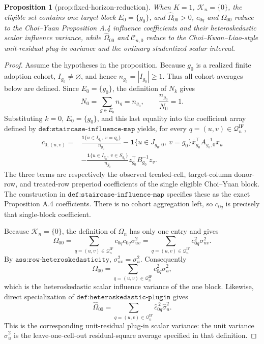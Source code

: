 \documentclass{article}
\newtheorem{proposition}{Proposition}
\begin{document}
\begin{proposition}[prop:fixed-horizon-reduction]\label{prop:fixed-horizon-reduction}
When \(K=1\), \(\mathcal K_n=\{0\}\), the eligible set contains one target block \(E_0=\{g_0\}\), and \(\widehat\Omega_{00}>0\), \(c_{0q}\) and \(\Omega_{00}\) reduce to the Choi--Yuan Proposition A.4 influence coefficients and their heteroskedastic scalar influence variance, while \(\widehat\Omega_{00}\) and \(\mathcal C_{n,0}\) reduce to the Choi--Kwon--Liao-style unit-residual plug-in variance and the ordinary studentized scalar interval.
\end{proposition}
\begin{proof}
Assume the hypotheses in the proposition.  Because \(g_0\) is a realized
finite adoption cohort, \(I_{g_0}\neq\varnothing\), and hence
\(n_{g_0}=|I_{g_0}|\geq 1\).  Thus all cohort averages below are defined.
Since \(E_0=\{g_0\}\), the definition of \(N_k\) gives
\[
N_0=\sum_{g\in E_0}n_g=n_{g_0},
\qquad
\frac{n_{g_0}}{N_0}=1.
\]
Substituting \(k=0\), \(E_0=\{g_0\}\), and this last equality into the
coefficient array defined by \(\texttt{def:staircase-influence-map}\) yields,
for every \(q=(u,v)\in\mathcal Q_n^{\mathrm{IF}}\),
\[
\begin{aligned}
c_{0,(u,v)}
={}&\frac{\mathbf 1\{u\in I_{g_0},\ v=g_0\}}{n_{g_0}}
-\mathbf 1\{u\in J_{g_0,0},\ v=g_0\}
  \bar x_{g_0}^{\top}A_{g_0,0}^{-1}x_u \\
&-\frac{\mathbf 1\{u\in I_{g_0},\ v\in S_{g_0}\}}{n_{g_0}}
  z_{g_0}^{\top}B_{g_0}^{-1}z_v .
\end{aligned}
\]
The three terms are respectively the observed treated-cell, target-column
donor-row, and treated-row preperiod coefficients of the single eligible
Choi--Yuan block.  The construction in
\(\texttt{def:staircase-influence-map}\) specifies these as the exact
Proposition A.4 coefficients.  There is no cohort aggregation left, so
\(c_{0q}\) is precisely that single-block coefficient.

Because \(\mathcal K_n=\{0\}\), the definition of \(\Omega_n\) has only one
entry and gives
\[
\Omega_{00}
=\sum_{q=(u,v)\in\mathcal Q_n^{\mathrm{IF}}}
  c_{0q}c_{0q}\sigma_{uv}^{2}
=\sum_{q=(u,v)\in\mathcal Q_n^{\mathrm{IF}}}
  c_{0q}^{2}\sigma_{uv}^{2}.
\]
By \(\texttt{ass:row-heteroskedasticity}\),
\(\sigma_{uv}^{2}=\sigma_u^{2}\).  Consequently
\[
\Omega_{00}
=\sum_{q=(u,v)\in\mathcal Q_n^{\mathrm{IF}}}c_{0q}^{2}\sigma_u^{2},
\]
which is the heteroskedastic scalar influence variance of the one block.
Likewise, direct specialization of
\(\texttt{def:heteroskedastic-plugin}\) gives
\[
\widehat\Omega_{00}
=\sum_{q=(u,v)\in\mathcal Q_n^{\mathrm{IF}}}
  \widehat c_{0q}^{\,2}\widehat\sigma_u^{2}.
\]
This is the corresponding unit-residual plug-in scalar variance: the unit
variance \(\widehat\sigma_u^2\) is the leave-one-cell-out residual-square
average specified in that definition.


\end{proof}
\end{document}
